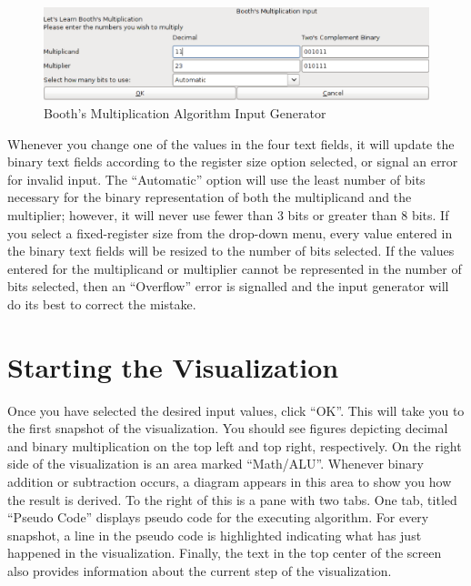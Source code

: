 \documentclass{article}
\begin{document}
\pagebreak

\begin{figure}[h]
\centering
\includegraphics[scale=0.3]{ingen.pdf}
\caption{Booth's Multiplication Algorithm Input Generator}
\end{figure}

Whenever you change one of the values in the four text fields, it will update the binary text fields according to the register size option selected, or signal an error for invalid input.
The ``Automatic'' option will use the least number of bits necessary for the binary representation of both the multiplicand and the multiplier; however, it will never use fewer than 3 bits or greater than 8 bits.
If you select a fixed-register size from the drop-down menu, every value entered in the binary text fields will be resized to the number of bits selected.
If the values entered for the multiplicand or multiplier cannot be represented in the number of bits selected, then an ``Overflow'' error is signalled and the input generator will do its best to correct the mistake.

\section{Starting the Visualization}

Once you have selected the desired input values, click ``OK''.
This will take you to the first snapshot of the visualization.
You should see figures depicting decimal and binary multiplication on the top left and top right, respectively.
On the right side of the visualization is an area marked ``Math/ALU''.
Whenever binary addition or subtraction occurs, a diagram appears in this area to show you how the result is derived.
To the right of this is a pane with two tabs.
One tab, titled ``Pseudo Code'' displays pseudo code for the executing algorithm.
For every snapshot, a line in the pseudo code is highlighted indicating what has just happened in the visualization.
Finally, the text in the top center of the screen also provides information about the current step of the visualization.
\end{document}
